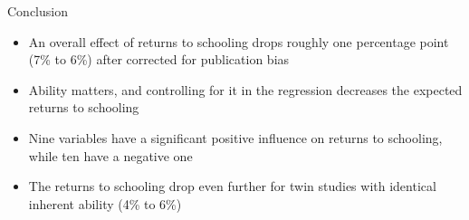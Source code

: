 \documentclass{beamer} %
\begin{document}




\begin{frame}{Conclusion}
    \begin{itemize}
        \item<1-> An overall effect of returns to schooling drops roughly one percentage point (7\% to 6\%) after corrected for publication bias
        \item<2-> Ability matters, and controlling for it in the regression decreases the expected returns to schooling
        \item<3-> Nine variables have a significant positive influence on returns to schooling, while ten have a negative one
        \item<4-> The returns to schooling drop even further for twin studies with identical inherent ability (4\% to 6\%)
    \end{itemize}
\end{frame}





\end{document}
